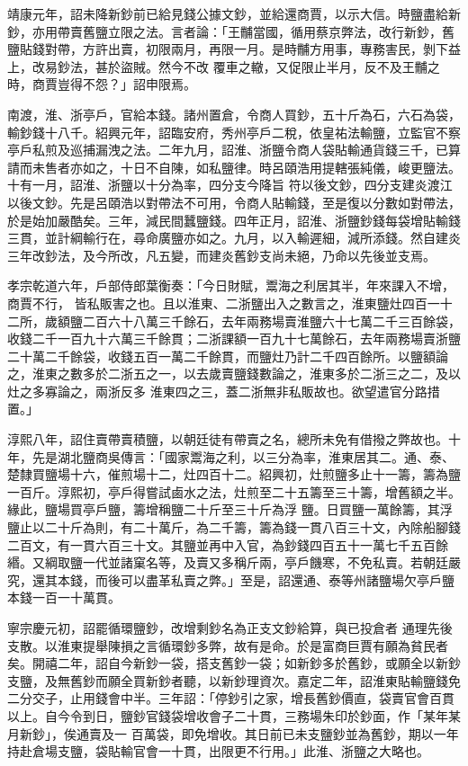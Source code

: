 \begin{pinyinscope}
 靖康元年，詔未降新鈔前已給見錢公據文鈔，並給還商賈，以示大信。時鹽盡給新鈔，亦用帶賣舊鹽立限之法。言者論：「王黼當國，循用蔡京弊法，改行新鈔，舊鹽貼錢對帶，方許出賣，初限兩月，再限一月。是時黼方用事，專務害民，剝下益上，改易鈔法，甚於盜賊。然今不改
 覆車之轍，又促限止半月，反不及王黼之時，商賈豈得不怨？」詔申限焉。



 南渡，淮、浙亭戶，官給本錢。諸州置倉，令商人買鈔，五十斤為石，六石為袋，輸鈔錢十八千。紹興元年，詔臨安府，秀州亭戶二稅，依皇祐法輸鹽，立監官不察亭戶私煎及巡捕漏洩之法。二年九月，詔淮、浙鹽令商人袋貼輸通貨錢三千，已算請而未售者亦如之，十日不自陳，如私鹽律。時呂頤浩用提轄張純儀，峻更鹽法。十有一月，詔淮、浙鹽以十分為率，四分支今降旨
 符以後文鈔，四分支建炎渡江以後文鈔。先是呂頤浩以對帶法不可用，令商人貼輸錢，至是復以分數如對帶法，於是始加嚴酷矣。三年，減民間蠶鹽錢。四年正月，詔淮、浙鹽鈔錢每袋增貼輸錢三貫，並計綱輸行在，尋命廣鹽亦如之。九月，以入輸遲細，減所添錢。然自建炎三年改鈔法，及今所改，凡五變，而建炎舊鈔支尚未絕，乃命以先後並支焉。



 孝宗乾道六年，戶部侍郎葉衡奏：「今日財賦，鬻海之利居其半，年來課入不增，商賈不行，
 皆私販害之也。且以淮東、二浙鹽出入之數言之，淮東鹽灶四百一十二所，歲額鹽二百六十八萬三千餘石，去年兩務場賣淮鹽六十七萬二千三百餘袋，收錢二千一百九十六萬三千餘貫；二浙課額一百九十七萬餘石，去年兩務場賣浙鹽二十萬二千餘袋，收錢五百一萬二千餘貫，而鹽灶乃計二千四百餘所。以鹽額論之，淮東之數多於二浙五之一，以去歲賣鹽錢數論之，淮東多於二浙三之二，及以灶之多寡論之，兩浙反多
 淮東四之三，蓋二浙無非私販故也。欲望遣官分路措置。」



 淳熙八年，詔住賣帶賣積鹽，以朝廷徒有帶賣之名，總所未免有借撥之弊故也。十年，先是湖北鹽商吳傳言：「國家鬻海之利，以三分為率，淮東居其二。通、泰、楚隸買鹽場十六，催煎場十二，灶四百十二。紹興初，灶煎鹽多止十一籌，籌為鹽一百斤。淳熙初，亭戶得嘗試鹵水之法，灶煎至二十五籌至三十籌，增舊額之半。緣此，鹽場買亭戶鹽，籌增稱鹽二十斤至三十斤為浮
 鹽。日買鹽一萬餘籌，其浮鹽止以二十斤為則，有二十萬斤，為二千籌，籌為錢一貫八百三十文，內除船腳錢二百文，有一貫六百三十文。其鹽並再中入官，為鈔錢四百五十一萬七千五百餘緡。又綱取鹽一代並諸窠名等，及賣又多稱斤兩，亭戶饑寒，不免私賣。若朝廷嚴究，還其本錢，而後可以盡革私賣之弊。」至是，詔還通、泰等州諸鹽場欠亭戶鹽本錢一百一十萬貫。



 寧宗慶元初，詔罷循環鹽鈔，改增剩鈔名為正支文鈔給算，與已投倉者
 通理先後支散。以淮東提舉陳損之言循環鈔多弊，故有是命。於是富商巨賈有願為貧民者矣。開禧二年，詔自今新鈔一袋，搭支舊鈔一袋；如新鈔多於舊鈔，或願全以新鈔支鹽，及無舊鈔而願全買新鈔者聽，以新鈔理資次。嘉定二年，詔淮東貼輸鹽錢免二分交子，止用錢會中半。三年詔：「停鈔引之家，增長舊鈔價直，袋賣官會百貫以上。自今令到日，鹽鈔官錢袋增收會子二十貫，三務場朱印於鈔面，作「某年某月新鈔」，俟通賣及一
 百萬袋，即免增收。其日前已未支鹽鈔並為舊鈔，期以一年持赴倉場支鹽，袋貼輸官會一十貫，出限更不行用。」此淮、浙鹽之大略也。




\end{pinyinscope}
